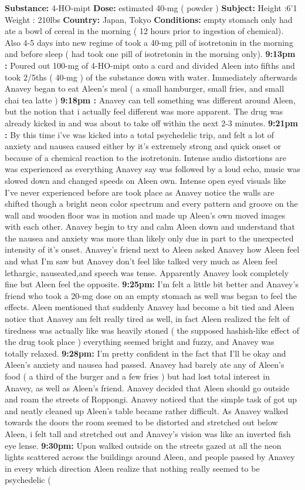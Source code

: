 \documentclass[12pt]{book}
\begin{document}
\textbf{Substance:} 4-HO-mipt \textbf{Dose:} estimated 40-mg ( powder ) \textbf{Subject:} Height :6'1 Weight : 210lbs \textbf{Country:} Japan, Tokyo \textbf{Conditions:} empty stomach only had ate a bowl of cereal in the morning ( 12 hours prior to ingestion of chemical). Also 4-5 days into new regime of took a 40-mg pill of isotretonin in the morning and before sleep ( had took one pill of isotretonin in the morning only). \textbf{9:13pm :} Poured out 100-mg of 4-HO-mipt onto a card and divided Aleen into fifths and took 2/5ths ( 40-mg ) of the substance down with water. Immediately afterwards Anavey began to eat Aleen's meal (  a small hamburger, small fries, and small chai tea latte ) \textbf{9:18pm :} Anavey can tell something was different around Aleen, but the notion that i actually feel different was more apparent. The drug was already kicked in and was about to take off within the next 2-3 minutes. \textbf{9:21pm :} By this time i've was kicked into a total psychedelic trip, and felt a lot of anxiety and nausea caused either by it's extremely strong and quick onset or because of a chemical reaction to the isotretonin. Intense audio distortions are was experienced as everything Anavey say was followed by a loud echo, music was slowed down and changed speeds on Aleen own. Intense open eyed visuals like I've never experienced before are took place as Anavey notice the walls are shifted though a bright neon color spectrum and every pattern and groove on the wall and wooden floor was in motion and made up Aleen's own moved images with each other. Anavey begin to try and calm Aleen down and understand that the nausea and anxiety was more than likely only due in part to the unexpected intensity of it's onset. Anavey's friend next to Aleen asked Anavey how Aleen feel and what I'm saw but Anavey don't feel like talked very much as Aleen feel lethargic, nauseated,and speech was tense. Apparently Anavey look completely fine but Aleen feel the opposite. \textbf{9:25pm:} I'm felt a little bit better and Anavey's friend who took a 20-mg dose on an empty stomach as well was began to feel the effects. Aleen mentioned that suddenly Anavey had become a bit tied and Aleen notice that Anavey am felt really tired as well, in fact Aleen realized the felt of tiredness was actually like was heavily stoned ( the supposed hashish-like effect of the drug took place ) everything seemed bright and fuzzy, and Anavey was totally relaxed. \textbf{9:28pm:} I'm pretty confident in the fact that I'll be okay and Aleen's anxiety and nausea had passed. Anavey had barely ate any of Aleen's food ( a third of the burger and a few fries ) but had lost total interest in Anavey, as well as Aleen's friend. Anavey decided that Aleen should go outside and roam the streets of Roppongi. Anavey noticed that the simple task of got up and neatly cleaned up Aleen's table became rather difficult. As Anavey walked towards the doors the room seemed to be distorted and stretched out below Aleen, i felt tall and stretched out and Anavey's vision was like an inverted fish eye lense. \textbf{9:30pm:} Upon walked outside on the streets gazed at all the neon lights scattered across the buildings around Aleen, and people passed by Anavey in every which direction Aleen realize that nothing really seemed to be psychedelic ( 
\end{document}
